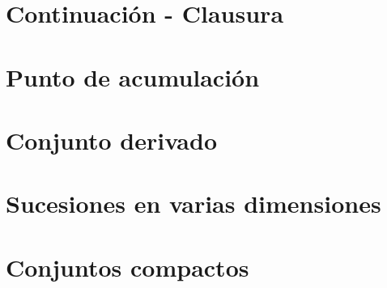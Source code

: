 \section{Continuación - Clausura}

\section{Punto de acumulación}

\section{Conjunto derivado}

\section{Sucesiones en varias dimensiones}

\section{Conjuntos compactos}
